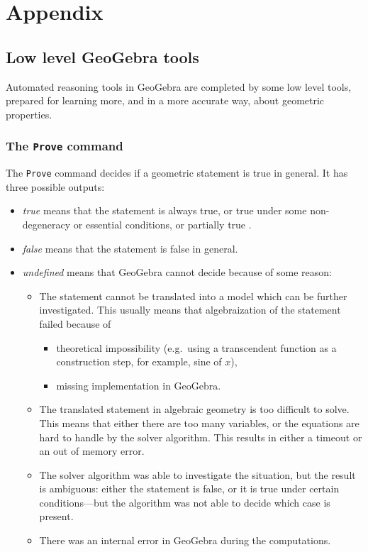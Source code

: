 \documentclass{article}
\begin{document}
\section{Appendix}
\label{sec:Appendix}
\subsection{Low level GeoGebra tools}

Automated reasoning tools in GeoGebra are completed by some low level tools,  prepared for learning more,  and in a more accurate way,  about geometric properties.

\subsubsection{The \texttt{Prove} command}
The \texttt{Prove} command decides if a geometric statement is true in general. It has three possible outputs:
\begin{itemize}
    \item \textit{true} means that the statement is always true, or true under some non-degeneracy \cite{Chou,CoxLittleOShea,RecioVelez} or essential \cite{KovacsRecioSolyomGecse} conditions, or partially true 
\cite{BotanaRecio2016,KovacsRecioVelez}.
    \item \textit{false} means that the statement is false in general.
    \item \textit{undefined} means that GeoGebra cannot decide because of some reason:
    \begin{itemize}
        \item The statement cannot be translated into a model which can be further investigated. This usually means that algebraization of the statement failed because of 
        \begin{itemize}
            \item theoretical impossibility (e.g.~using a transcendent function as a construction step, for example, sine of $x$),
            \item missing implementation in GeoGebra.
        \end{itemize}
        \item The translated statement in algebraic geometry is too difficult to solve. This means that either there are too many variables, or the equations are hard to handle by the solver algorithm. This results in either a timeout or an out of memory error.
        \item The solver algorithm was able to investigate the situation, but the result is ambiguous: either the statement is false, or it is true under certain conditions---but the algorithm was not able to decide which case is present.
        \item There was an internal error in GeoGebra during the computations.
    \end{itemize}
\end{itemize}
\end{document}
